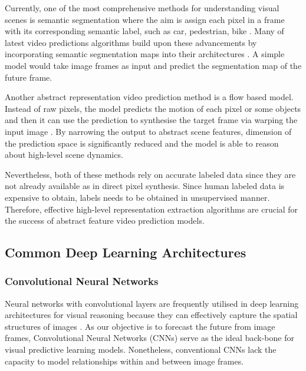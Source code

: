 \documentclass{l4proj}
\begin{document}
Currently, one of the most comprehensive methods for understanding visual scenes is semantic segmentation where the aim is assign each pixel in a frame with its corresponding semantic label, such as car, pedestrian, bike \citep{DBLP:journals/pami/FarabetCNL13, DBLP:conf/cvpr/LongSD15, DBLP:journals/pami/ShelhamerLD17}. Many of latest video predictions algorithms build upon these advancements by incorporating semantic segmentation maps into their architectures \citep{ DBLP:conf/bmvc/NabaviRW18, DBLP:journals/corr/abs-1803-11496}. A simple model would take image frames as input and predict the segmentation map of the future frame.

Another abstract representation video prediction method is a flow based model. Instead of raw pixels, the model predicts the motion of each pixel or some objects \citep{DBLP:journals/corr/WalkerGH15} and then it can use the prediction to synthesise the target frame via warping the input image \citep{DBLP:journals/corr/ZhouTSME16}. By narrowing the output to abstract scene features, dimension of the prediction space is significantly reduced and the model is able to reason about high-level scene dynamics.

Nevertheless, both of these methods rely on accurate labeled data since they are not already available as in direct pixel synthesis. Since human labeled data is expensive to obtain, labels needs to be obtained in unsupervised manner. Therefore, effective high-level representation extraction algorithms are crucial for the success of abstract feature video prediction models.

\subsection{Common Deep Learning Architectures}
\subsubsection{Convolutional Neural Networks}

Neural networks with convolutional layers are frequently utilised in deep learning architectures for visual reasoning because they can effectively capture the spatial structures of images \citep{Lecun98}. As our objective is to forecast the future from image frames, Convolutional Neural Networks (CNNs) serve as the ideal back-bone for visual predictive learning models. Nonetheless, conventional CNNs lack the capacity to model relationships within and between image frames.
\end{document}
